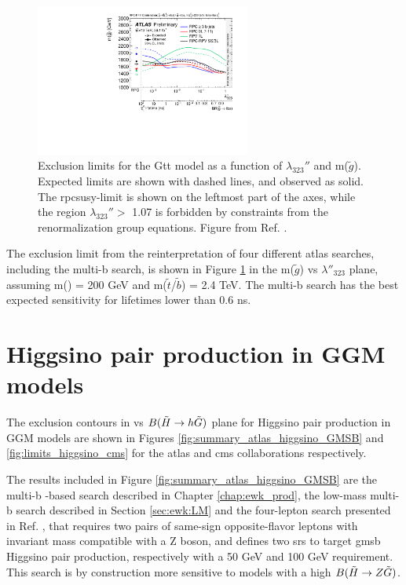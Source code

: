 \begin{figure}[htbp]
	\centering
	\includegraphics[width=0.63\textwidth]{figures/rpv/fig_04.pdf}
	\caption{	
	Exclusion limits for the Gtt model as a function of $\lambda_{323}''$ and m($\tilde{g}$). Expected limits are shown with dashed lines, and observed as solid. The \gls{rpcsusy}-limit is shown on the leftmost part of the axes, while the region $\lambda_{323}''>$ 1.07 is forbidden by constraints from the renormalization group equations. Figure from Ref. \cite{ATLAS-CONF-2018-003}.
	} 
	\label{fig:rpv_Gtt}
\end{figure}

The exclusion limit from the reinterpretation of four different \gls{atlas} searches, including the multi-b search, 
is shown in Figure \ref{fig:rpv_Gtt} in the m($\tilde{g}$) vs $\lambda''_{323}$ plane, assuming m(\ninoone) = 200 GeV and  
m($\tilde{t}$/$\tilde{b}$) = 2.4 TeV. 
The multi-b search has the best expected sensitivity 
for \ninoone lifetimes lower than 0.6 ns. 


\FloatBarrier

\section{Higgsino pair production in GGM models}

The exclusion contours in \mhino vs $B(\tilde{H}\rightarrow h \tilde{G})$ plane for Higgsino pair production in GGM models 
are shown in Figures \ref{fig:summary_atlas_higgsino_GMSB} 
and \ref{fig:limits_higgsino_cms} for the \gls{atlas} and \gls{cms} collaborations respectively.

The results included in Figure \ref{fig:summary_atlas_higgsino_GMSB} are the multi-b \met-based search described in Chapter \ref{chap:ewk_prod},
the low-mass multi-b search described in Section \ref{sec:ewk:LM} and 
the four-lepton search presented in Ref. \cite{Aaboud:2018zeb}, that requires two pairs of same-sign opposite-flavor leptons 
with invariant mass compatible with a Z boson, and defines two \glspl{sr} to target \gls{gmsb} Higgsino pair production, respectively 
with a 50 GeV and 100 GeV \met requirement. This search is by construction more sensitive to models with a high $B(\tilde{H}\rightarrow Z \tilde{G})$.

